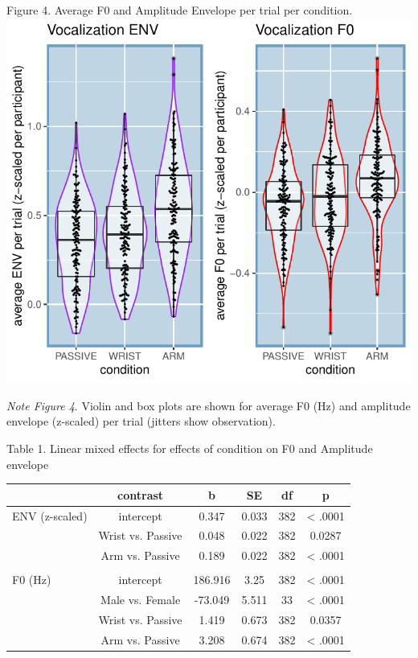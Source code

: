 \documentclass[
  man, noextraspace,floatsintext]{apa6}
\begin{document}
Figure 4. Average F0 and Amplitude Envelope per trial per condition.
\includegraphics{GS_physics_in_fluid_speech_files/figure-latex/plot_avF0_avENV-1.pdf}

\emph{Note Figure 4}. Violin and box plots are shown for average F0 (Hz) and amplitude envelope (z-scaled) per trial (jitters show observation).

\pagebreak

Table 1. Linear mixed effects for effects of condition on F0 and Amplitude envelope

\begin{tabular}{lccccc}
\toprule
  & contrast & b & SE & df & p\\
\midrule
ENV (z-scaled) & intercept & 0.347 & 0.033 & 382 & < .0001\\
 & Wrist vs. Passive & 0.048 & 0.022 & 382 & 0.0287\\
 & Arm vs. Passive & 0.189 & 0.022 & 382 & < .0001\\
 &  &  &  &  & \\
F0 (Hz) & intercept & 186.916 & 3.25 & 382 & < .0001\\
\addlinespace
 & Male vs. Female & -73.049 & 5.511 & 33 & < .0001\\
 & Wrist vs. Passive & 1.419 & 0.673 & 382 & 0.0357\\
 & Arm vs. Passive & 3.208 & 0.674 & 382 & < .0001\\
\bottomrule
\end{tabular}
\end{document}

